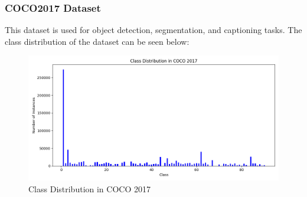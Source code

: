 \documentclass{beamer}
\begin{document}
\begin{frame}[t]
  \frametitle{COCO2017 Dataset}
  This dataset is used for object detection, segmentation, and captioning tasks. The class distribution of the dataset can be seen below:
  \begin{figure}[h!]
    \centering
    \includegraphics[scale=0.45]{Figures/coco2017_class_distribution.png}
    \caption{Class Distribution in COCO 2017}
    \label{fig:coco-class}
  \end{figure}
\end{frame}
\end{document}
